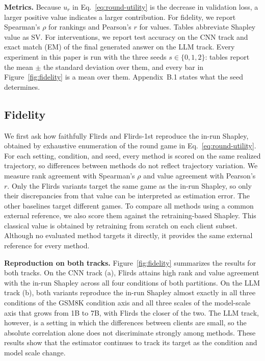 \documentclass[letterpaper]{article} %
\theoremstyle{definition} %
\begin{document}
\noindent\textbf{Metrics.} Because $u_r$ in Eq.~\eqref{eq:round-utility} is the decrease
in validation loss, a larger positive value indicates a larger contribution.
For fidelity, we report Spearman's $\rho$ for rankings and Pearson's $r$ for
values. Tables abbreviate Shapley value as SV. For
interventions, we report test accuracy on the CNN track and exact match (EM)
of the final generated answer on the LLM track. Every experiment in this paper
is run with the three seeds $s \in \{0, 1, 2\}$: tables report the mean $\pm$
the standard deviation over them, and every bar in
Figure~\ref{fig:fidelity} is a mean over them. Appendix~B.1 states what the
seed determines.

\subsection{Fidelity}
\label{sec:fidelity}

We first ask how faithfully Flirds and Flirds-1st reproduce the in-run
Shapley, obtained by exhaustive enumeration of the round game in
Eq.~\eqref{eq:round-utility}. For each setting, condition, and seed, every
method is scored on the same realized trajectory, so differences between
methods do not reflect trajectory variation. We measure
rank agreement with Spearman's $\rho$ and value agreement with Pearson's
$r$.
Only the Flirds variants target the same game as the in-run Shapley, so only
their discrepancies from that value can be interpreted as estimation error.
The other baselines target different games. To compare all methods using a
common external reference, we also score them against the retraining-based
Shapley. This classical value is obtained by retraining from scratch on each
client subset. Although no evaluated method targets it directly, it provides
the same external reference for every method.

\noindent\textbf{Reproduction on both tracks.} Figure~\ref{fig:fidelity} summarizes the
results for both tracks.
On the CNN track (a), Flirds attains high rank and
value agreement with the in-run Shapley across all four conditions of both
partitions. On the LLM track (b), both variants reproduce the in-run Shapley
almost exactly in all three conditions of the GSM8K condition axis and all three scales of the
model-scale axis that grows from 1B to 7B, with Flirds the closer of the two.
The LLM track, however, is a
setting in which the differences between clients are small, so the absolute
correlation alone does not discriminate strongly among methods. These results
show that the estimator continues to track its target as the condition and model scale change.
\end{document}
